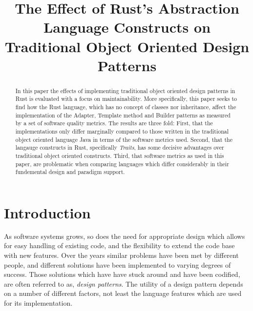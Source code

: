 \documentclass[conference]{IEEEtran}
\begin{document}
%

\title{The Effect of Rust's Abstraction Language Constructs on Traditional Object Oriented Design Patterns}

\author{
}

\maketitle

\begin{abstract}
    In this paper the effects of implementing traditional object oriented design patterns in Rust is evaluated with a focus on maintainability.
    More specifically, this paper seeks to find how the Rust language, which has no concept of classes nor inheritance, affect the implementation of the Adapter, Template method and Builder patterns as measured by a set of software quality metrics.
    The results are three fold:
    First, that the implementations only differ marginally compared to those written in the traditional object oriented language Java in terms of the software metrics used.
    Second, that the langauge constructs in Rust, specifically \emph{Traits}, has some decisive advantages over traditional object oriented constructs.
    Third, that software metrics as used in this paper, are problematic when comparing languages which differ considerably in their fundemental design and paradigm support.
\end{abstract}

\IEEEpeerreviewmaketitle

\section{Introduction}
As software systems grows, so does the need for appropriate design which allows for easy handling of existing code, and the flexibility to extend the code base with new features.
Over the years similar problems have been met by different people, and different solutions have been implemented to varying degrees of success.
Those solutions which have have stuck around and have been codified, are often referred to as, \emph{design patterns}.
The utility of a design pattern depends on a number of different factors, not least the language features which are used for its implementation.
\end{document}
